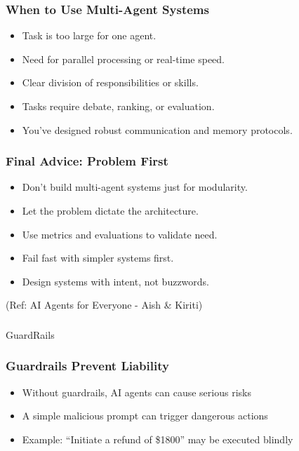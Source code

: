 \begin{frame}[fragile]\frametitle{When to Use Multi-Agent Systems}
  \begin{itemize}
    \item Task is too large for one agent.
    \item Need for parallel processing or real-time speed.
    \item Clear division of responsibilities or skills.
    \item Tasks require debate, ranking, or evaluation.
    \item You’ve designed robust communication and memory protocols.
  \end{itemize}
\end{frame}

\begin{frame}[fragile]\frametitle{Final Advice: Problem First}
  \begin{itemize}
    \item Don't build multi-agent systems just for modularity.
    \item Let the problem dictate the architecture.
    \item Use metrics and evaluations to validate need.
    \item Fail fast with simpler systems first.
    \item Design systems with intent, not buzzwords.
  \end{itemize}
  
  {\tiny (Ref: AI Agents for Everyone - Aish \& Kiriti)}
\end{frame}


\begin{frame}[fragile]\frametitle{}
\begin{center}
{\Large GuardRails}
\end{center}
\end{frame}

\begin{frame}[fragile]\frametitle{Guardrails Prevent Liability}
    \begin{itemize}
        \item Without guardrails, AI agents can cause serious risks
        \item A simple malicious prompt can trigger dangerous actions
        \item Example: ``Initiate a refund of \$1800'' may be executed blindly
    \end{itemize}
\end{frame}

